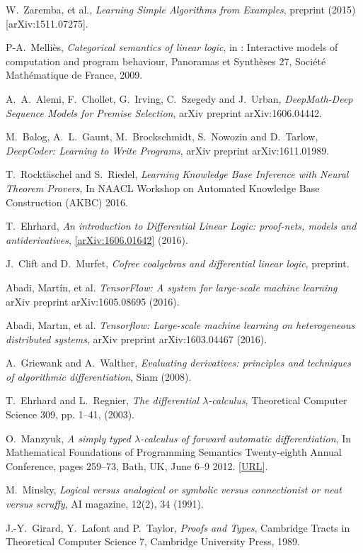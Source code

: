 \documentclass[english,letter paper,12pt,leqno]{article}
\theoremstyle{example}
\numberwithin{equation}{section}
\begin{document}
\begin{thebibliography}{BHLS03}
W.~Zaremba, et al., \textsl{Learning Simple Algorithms from Examples}, preprint (2015) [arXiv:1511.07275].

P-A.~Melli\`{e}s, \textsl{Categorical semantics of linear logic}, in : Interactive models of computation and program behaviour, Panoramas et Synth\`{e}ses $27$, Soci\'{e}t\'{e} Math\'{e}matique de France, 2009.

A.~A.~Alemi, F.~Chollet, G.~Irving, C.~Szegedy and J.~Urban, \textsl{DeepMath-Deep Sequence Models for Premise Selection}, arXiv preprint arXiv:1606.04442.

M.~Balog, A.~L.~Gaunt, M.~Brockschmidt, S.~Nowozin and D.~Tarlow, \textsl{DeepCoder: Learning to Write Programs}, arXiv preprint arXiv:1611.01989.

T.~Rockt\"aschel and S.~Riedel, \textsl{Learning Knowledge Base Inference with Neural Theorem Provers}, In NAACL Workshop on Automated Knowledge Base Construction (AKBC) 2016.

T.~Ehrhard, \textsl{An introduction to Differential Linear Logic: proof-nets, models and antiderivatives}, \href{https://arxiv.org/abs/1606.01642}{[arXiv:1606.01642]} (2016).

J.~Clift and D.~Murfet, \textsl{Cofree coalgebras and differential linear logic}, preprint.

Abadi, Martín, et al. \textsl{TensorFlow: A system for large-scale machine learning} arXiv preprint arXiv:1605.08695 (2016).

Abadi, Martın, et al. \textsl{Tensorflow: Large-scale machine learning on heterogeneous distributed systems}, arXiv preprint arXiv:1603.04467 (2016).

A.~Griewank and A.~Walther, \textsl{Evaluating derivatives: principles and techniques of algorithmic differentiation}, Siam (2008).

T.~Ehrhard and L.~Regnier, \textsl{The differential $\lambda$-calculus}, Theoretical Computer Science 309, pp. 1--41, (2003).

O.~Manzyuk, \textsl{A simply typed $\lambda$-calculus of forward automatic differentiation}, In Mathematical Foundations of Programming Semantics Twenty-eighth Annual Conference, pages 259--73, Bath, UK, June 6–9 2012. \href{http://dauns.math.tulane.edu/~mfps/mfps28proc.pdf}{[URL]}.

M.~Minsky, \textsl{Logical versus analogical or symbolic versus connectionist or neat versus scruffy}, AI magazine, 12(2), 34 (1991).

J.-Y.~Girard, Y.~Lafont and P.~Taylor, \textsl{Proofs and Types}, Cambridge Tracts in Theoretical Computer Science 7, Cambridge University Press, 1989.

\end{thebibliography}
\end{document}
